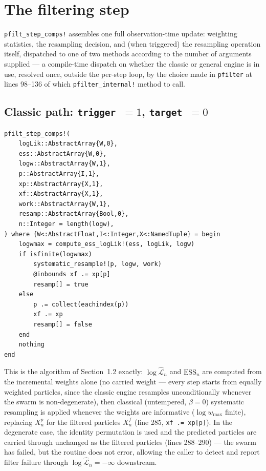 \documentclass[11pt]{article}
\newcommand{\ESS}{\mathrm{ESS}}
\begin{document}
\section{The filtering step}
\label{sec:step}

\texttt{pfilt\_step\_comps!} assembles one full observation-time update:
weighting statistics, the resampling decision, and (when triggered) the
resampling operation itself, dispatched to one of two methods according to
the number of arguments supplied — a compile-time dispatch on whether the
classic or general engine is in use, resolved once, outside the per-step
loop, by the choice made in \texttt{pfilter} at lines 98--136 of which
\texttt{pfilter\_internal!} method to call.

\subsection{Classic path: \texttt{trigger}~$=1$, \texttt{target}~$=0$}

\begin{lstlisting}[caption={Classic filtering step (\texttt{pfilter.jl}, lines 271--293)}]
pfilt_step_comps!(
    logLik::AbstractArray{W,0},
    ess::AbstractArray{W,0},
    logw::AbstractArray{W,1},
    p::AbstractArray{I,1},
    xp::AbstractArray{X,1},
    xf::AbstractArray{X,1},
    work::AbstractArray{W,1},
    resamp::AbstractArray{Bool,0},
    n::Integer = length(logw),
) where {W<:AbstractFloat,I<:Integer,X<:NamedTuple} = begin
    logwmax = compute_ess_logLik!(ess, logLik, logw)
    if isfinite(logwmax)
        systematic_resample!(p, logw, work)
        @inbounds xf .= xp[p]
        resamp[] = true
    else
        p .= collect(eachindex(p))
        xf .= xp
        resamp[] = false
    end
    nothing
end
\end{lstlisting}

This is the algorithm of Section~1.2 exactly: $\log\widehat{\mathcal L}_n$
and $\ESS_n$ are computed from the incremental weights alone (no carried
weight — every step starts from equally weighted particles, since the
classic engine resamples unconditionally whenever the swarm is non-degenerate),
then classical (untempered, $\beta=0$) systematic resampling is applied
whenever the weights are informative ($\log w_{\max}$ finite), replacing
$X_n^{p} $ for the filtered particles $X_n^f$ (line 285,
\texttt{xf .= xp[p]}). In the degenerate case, the identity permutation is
used and the predicted particles are carried through unchanged as the
filtered particles (lines 288--290) — the swarm has failed, but the routine
does not error, allowing the caller to detect and report filter failure
through $\log\widehat{\mathcal L}_n=-\infty$ downstream.
\end{document}
